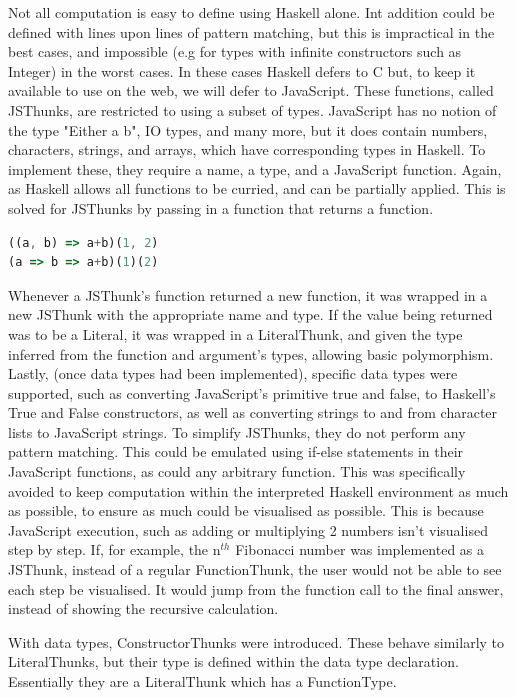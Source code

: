 Not all computation is easy to define using Haskell alone. Int addition could be defined with lines upon lines of pattern matching, but this is impractical in the best cases, and impossible (e.g for types with infinite constructors such as Integer) in the worst cases. In these cases Haskell defers to C but, to keep it available to use on the web, we will defer to JavaScript. These functions, called JSThunks, are restricted to using a subset of types. JavaScript has no notion of the type "Either a b", IO types, and many more, but it does contain numbers, characters, strings, and arrays, which have corresponding types in Haskell.
To implement these, they require a name, a type, and a JavaScript function. Again, as Haskell allows all functions to be curried, and can be partially applied. This is solved for JSThunks by passing in a function that returns a function.
\begin{lstlisting}[language=JavaScript, caption=A curried addition function in JavaScript.]
((a, b) => a+b)(1, 2)
(a => b => a+b)(1)(2)
\end{lstlisting}
Whenever a JSThunk's function returned a new function, it was wrapped in a new JSThunk with the appropriate name and type. If the value being returned was to be a Literal, it was wrapped in a LiteralThunk, and given the type inferred from the function and argument's types, allowing basic polymorphism. Lastly, (once data types had been implemented), specific data types were supported, such as converting JavaScript's primitive true and false, to Haskell's True and False constructors, as well as converting strings to and from character lists to JavaScript strings.
To simplify JSThunks, they do not perform any pattern matching. This could be emulated using if-else statements in their JavaScript functions, as could any arbitrary function. This was specifically avoided to keep computation within the interpreted Haskell environment as much as possible, to ensure as much could be visualised as possible. This is because JavaScript execution, such as adding or multiplying 2 numbers isn't visualised step by step. If, for example, the n$^{th}$ Fibonacci number was implemented as a JSThunk, instead of a regular FunctionThunk, the user would not be able to see each step be visualised. It would jump from the function call to the final answer, instead of showing the recursive calculation.

With data types, ConstructorThunks were introduced. These behave similarly to LiteralThunks, but their type is defined within the data type declaration. Essentially they are a LiteralThunk which has a FunctionType.

